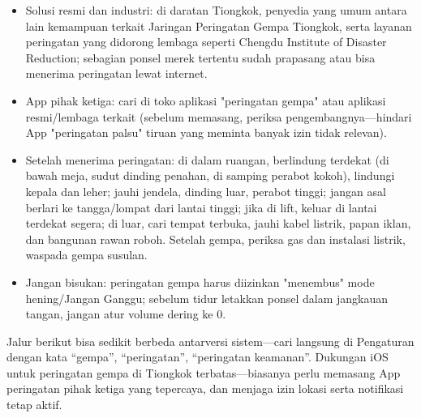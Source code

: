 \begin{itemize}
  \item Solusi resmi dan industri: di daratan Tiongkok, penyedia yang umum antara lain kemampuan terkait Jaringan Peringatan Gempa Tiongkok, serta layanan peringatan yang didorong lembaga seperti Chengdu Institute of Disaster Reduction; sebagian ponsel merek tertentu sudah prapasang atau bisa menerima peringatan lewat internet.
  \item App pihak ketiga: cari di toko aplikasi "peringatan gempa" atau aplikasi resmi/lembaga terkait (sebelum memasang, periksa pengembangnya—hindari App "peringatan palsu" tiruan yang meminta banyak izin tidak relevan).
  \item Setelah menerima peringatan: di dalam ruangan, berlindung terdekat (di bawah meja, sudut dinding penahan, di samping perabot kokoh), lindungi kepala dan leher; jauhi jendela, dinding luar, perabot tinggi; jangan asal berlari ke tangga/lompat dari lantai tinggi; jika di lift, keluar di lantai terdekat segera; di luar, cari tempat terbuka, jauhi kabel listrik, papan iklan, dan bangunan rawan roboh. Setelah gempa, periksa gas dan instalasi listrik, waspada gempa susulan.
  \item Jangan bisukan: peringatan gempa harus diizinkan "menembus" mode hening/Jangan Ganggu; sebelum tidur letakkan ponsel dalam jangkauan tangan, jangan atur volume dering ke 0.
\end{itemize}


Jalur berikut bisa sedikit berbeda antarversi sistem—cari langsung di Pengaturan dengan kata “gempa”, “peringatan”, “peringatan keamanan”. Dukungan iOS untuk peringatan gempa di Tiongkok terbatas—biasanya perlu memasang App peringatan pihak ketiga yang tepercaya, dan menjaga izin lokasi serta notifikasi tetap aktif.


